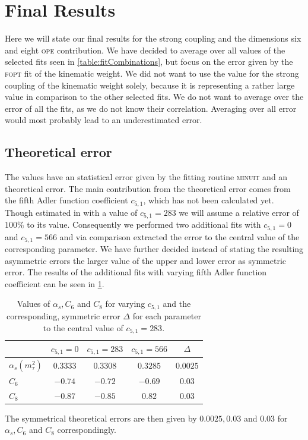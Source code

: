 \documentclass[../../index.tex]{subfiles}
\begin{document}
\section{Final Results}
Here we will state our final results for the strong coupling and the dimensions
six and eight \textsc{ope} contribution. We have decided to average over all
values of the selected fits seen in \cref{table:fitCombinations}, but focus on
the error given by the \textsc{fopt} fit of the kinematic weight. We did not
want to use the value for the strong coupling of the kinematic weight solely,
because it is representing a rather large value in comparison to the other
selected fits. We do not want to average over the error of all the fits, as we
do not know their correlation. Averaging over all error would most probably lead
to an underestimated error.

\subsection{Theoretical error}
The values have an statistical error given by the fitting routine
\textsc{minuit} and an theoretical error. The main contribution from the
theoretical error comes from the fifth Adler function coefficient \(c_{5,1}\),
which has not been calculated yet. Though estimated in \cite{Beneke2008} with a
value of \(c_{5,1} = 283\) we will assume a relative error of \(100\%\) to its
value. Consequently we performed two additional fits with \(c_{5,1} = 0 \) and
\(c_{5,1} = 566\) and via comparison extracted the error to the central value of
the corresponding parameter. We have further decided instead of stating the
resulting asymmetric errors the larger value of the upper and lower error as
symmetric error. The results of the additional fits with varying fifth Adler
function coefficient can be seen in \cref{table:theoreticalError}.
\begin{table}
  \centering
  \begin{tabular}{lcccc}
    \toprule
    & \(c_{5,1} = 0\) & \cellcolor{primary}\(c_{5,1}=283\) & \(c_{5,1}=566\) & \(\Delta\)\\
    \midrule
    \(\alpha_s(m_\tau^2)\) & \(0.3333\) & \cellcolor{primary}\(0.3308\) & \(0.3285\) & \(0.0025\) \\
    \(C_6\) &  \(-0.74\) & \cellcolor{primary}\(-0.72\) & \(-0.69\) & \(0.03\) \\
    \(C_8\) & \(-0.87\) & \cellcolor{primary}\(-0.85\) & \(0.82\) & \(0.03\) \\
    \bottomrule
  \end{tabular}
  \caption{Values of \(\alpha_s, C_6\) and \(C_8\) for varying \(c_{5,1}\) and
    the corresponding, symmetric error \(\Delta\) for each parameter to the
    central value of \(c_{5,1} = 283\).}
  \label{table:theoreticalError}
\end{table}
The symmetrical theoretical errors are then given by \(0.0025, 0.03\) and
\(0.03\) for \(\alpha_s, C_6\) and \(C_8\) correspondingly.
\end{document}
